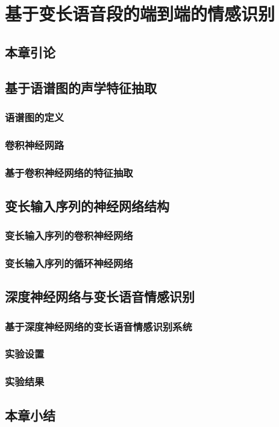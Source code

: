 \chapter{基于变长语音段的端到端的情感识别}
\label{cha:var_len_end2end}

\section{本章引论}

\section{基于语谱图的声学特征抽取}

\subsection{语谱图的定义}

\subsection{卷积神经网路}

\subsection{基于卷积神经网络的特征抽取}

\section{变长输入序列的神经网络结构}

\subsection{变长输入序列的卷积神经网络}

\subsection{变长输入序列的循环神经网络}

\section{深度神经网络与变长语音情感识别}

\subsection{基于深度神经网络的变长语音情感识别系统}

\subsection{实验设置}

\subsection{实验结果}

\section{本章小结}